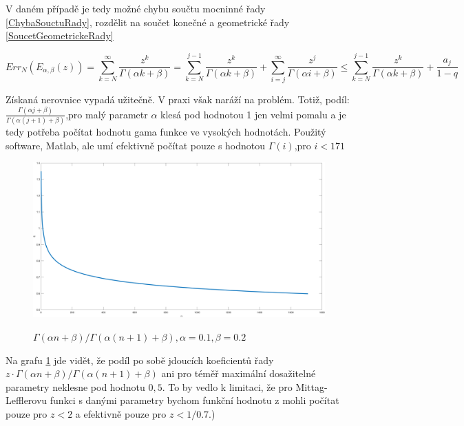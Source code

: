 \documentclass[a4paper,12pt,twoside]{article}
\theoremstyle{definition}
\theoremstyle{remark}
\numberwithin{equation}{section}
\numberwithin{table}{section}
\numberwithin{figure}{section}
\begin{document}
V daném případě je tedy možné chybu součtu mocninné řady \eqref{ChybaSouctuRady}, rozdělit na součet konečné a geometrické řady \eqref{SoucetGeometrickeRady} 

$$	Err_{N} \left(E_{\alpha, \beta} \left( z\right)\right) = \sum_{k=N}^{\infty} \frac{z^{k}}{\Gamma\left( \alpha k + \beta \right)} = \sum_{k=N}^{j-1} \frac{z^{k}}{\Gamma\left( \alpha k + \beta \right)} +\sum_{i=j}^{\infty} \frac{z^{j}}{\Gamma\left( \alpha i + \beta \right)} \leq \sum_{k=N}^{j-1} \frac{z^{k}}{\Gamma\left( \alpha k + \beta \right)} + \frac{a_{j}}{1-q} $$

Získaná nerovnice vypadá užitečně. V praxi však naráží na problém.
Totiž, podíl: $\frac{\Gamma \left(\alpha j + \beta\right)}{\Gamma \left(\alpha \left(j+1\right) + \beta\right)}$,pro malý parametr $\alpha$ klesá pod hodnotou 1 jen velmi pomalu a je tedy potřeba počítat hodnotu gama funkce ve vysokých hodnotách. Použitý software, Matlab, ale umí efektivně počítat pouze s hodnotou $\Gamma(i)$,pro $i < 171$

\begin{figure} %
	\caption{${\Gamma \left(\alpha n + \beta\right)}/{\Gamma \left(\alpha \left(n+1\right) + \beta\right)}, \alpha = 0.1, \beta = 0.2$}
	\includegraphics[width=1\textwidth]{fracGammaPlot.png}
	\label{fig:fracGammaPlot}
\end{figure}

Na grafu \ref{fig:fracGammaPlot} jde vidět, že podíl po sobě jdoucích koeficientů řady $z \cdot {\Gamma \left(\alpha n + \beta\right)}/{\Gamma \left(\alpha \left(n+1\right) + \beta\right)}$ ani pro téměř maximální dosažitelné parametry neklesne pod hodnotu $0,5$. To by vedlo k limitaci, že pro Mittag-Lefflerovu funkci s danými parametry bychom funkční hodnotu z mohli počítat pouze pro $z < 2$ a efektivně pouze pro $z < 1/0.7$.)
\end{document}
